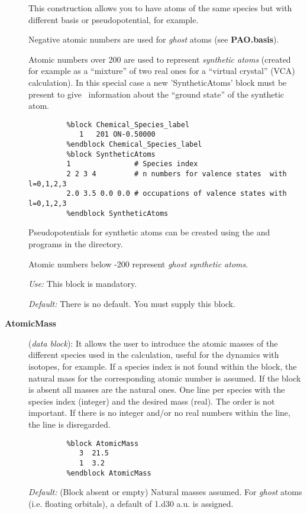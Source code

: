 \begin{description}
This construction allows you to have atoms of the same species but with
different basis or pseudopotential, for example.

Negative atomic numbers are used for \textit{ghost} atoms
(see \textbf{PAO.basis}).

Atomic numbers over 200 are used to represent \textit{synthetic atoms}
 (created for example as a ``mixture'' of two
real ones for a ``virtual crystal'' (VCA) calculation). In
this special case a new 'SyntheticAtoms' block
  must be present to give
\siesta\ information about the ``ground state'' of the synthetic
atom.

\begin{verbatim}
         %block Chemical_Species_label
            1   201 ON-0.50000
         %endblock Chemical_Species_label
         %block SyntheticAtoms
         1               # Species index
         2 2 3 4         # n numbers for valence states  with l=0,1,2,3
         2.0 3.5 0.0 0.0 # occupations of valence states with l=0,1,2,3
         %endblock SyntheticAtoms
\end{verbatim}

Pseudopotentials for synthetic atoms can be created using the
 and  programs  in the 
directory.

Atomic numbers below -200 represent \textit{ghost synthetic atoms}.

\textit{Use:} This block is mandatory.

\textit{Default:} There is no default. You must supply this block.



\item[\textbf{AtomicMass}] (\textit{data block}):
It allows the user to introduce
the atomic masses of the different species used in the calculation, useful
for the dynamics with isotopes, for example. If
a species index is not found within the block, the natural mass for the
corresponding atomic number is assumed. If the block is absent all masses
are the natural ones. One line per species with the species index (integer)
and the desired mass (real). The order is not important. If there is no
integer and/or no real numbers within the line, the line is disregarded.

\begin{verbatim}
         %block AtomicMass
            3  21.5
            1  3.2
         %endblock AtomicMass
\end{verbatim}

\textit{Default:} (Block absent or empty) Natural masses assumed. For
\textit{ghost} atoms (i.e. floating orbitals), a default of 1.d30 a.u. is
assigned.


\end{description}

